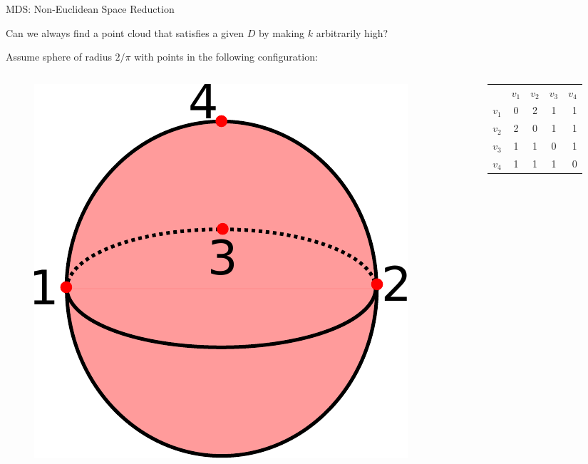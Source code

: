 \documentclass{beamer}
\begin{document}
\begin{frame}{MDS: Non-Euclidean Space Reduction}

Can we always find a point cloud that satisfies a given $D$ by making $k$ arbitrarily high?

Assume sphere of radius $2/\pi$ with points in the following configuration:

\begin{columns}
\begin{column}[T]{4cm}
\begin{figure}[t]
    \includegraphics[width=\textwidth]{SphereLinial.pdf}
\end{figure}
\end{column}

\begin{column}[T]{4cm}
\begin{center}
  \begin{tabular}{ | l | c | c | c | r | }
     & $v_1$ & $v_2$ & $v_3$ & $v_4$ \\
    $v_1$ & 0 & 2 & 1 & 1 \\ \hline
    $v_2$ & 2 & 0 & 1 & 1 \\ \hline
    $v_3$ & 1 & 1 & 0 & 1 \\ \hline
    $v_4$ & 1 & 1 & 1 & 0
  \end{tabular}
\end{center}
\end{column}
\end{columns}

\end{frame}
\end{document}
